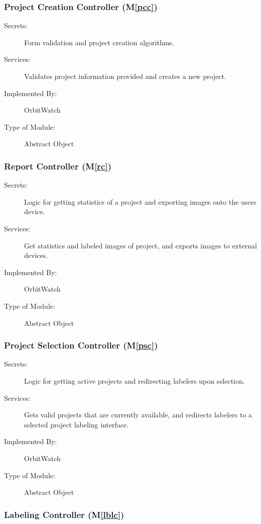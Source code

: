 \documentclass[12pt, titlepage]{article}
\newcommand{\mref}[1]{M\ref{#1}}
\begin{document}
\subsubsection{Project Creation Controller (\mref{pcc})}

\begin{description}
\item[Secrets:] Form validation and project creation algorithms.
\item[Services:] Validates project information provided and creates a new project.
\item[Implemented By:] OrbitWatch
\item[Type of Module:] Abstract Object
\end{description}

\subsubsection{Report Controller (\mref{rc})}

\begin{description}
\item[Secrets:] Logic for getting statistics of a project and exporting images onto the users device.
\item[Services:] Get statistics and labeled images of project, and exports images to external devices.
\item[Implemented By:] OrbitWatch
\item[Type of Module:] Abstract Object
\end{description}

\subsubsection{Project Selection Controller (\mref{psc})}

\begin{description}
\item[Secrets:] Logic for getting active projects and redirecting labelers upon selection.
\item[Services:] Gets valid projects that are currently available, and redirects labelers to a selected project labeling interface.
\item[Implemented By:] OrbitWatch
\item[Type of Module:] Abstract Object
\end{description}

\subsubsection{Labeling Controller (\mref{lblc})}
\end{document}
